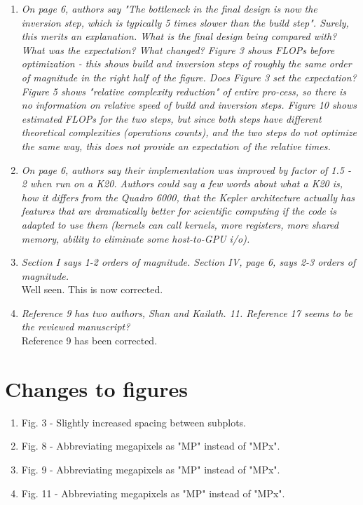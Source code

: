 \documentclass[11pt]{article} %
\newcommand\1{\vec 1}
\newcommand\q[1]{\textit{#1}}
\newcommand\qi[1]{\item\q{#1}}
\newcommand\ans[1]{#1}
\newcommand\ai[1]{\\[.5\baselineskip]\ans{#1}}
\begin{document}
\begin{enumerate}
%
\qi{On page 6, authors say "The bottleneck in the final design is now the inversion step, which is typically 5 times slower than the build step". Surely, this merits an explanation. What is the final design being compared with? What was the expectation? What changed? Figure 3 shows FLOPs before optimization - this shows build and inversion steps of roughly the same order of magnitude in the right half of the figure. Does Figure 3 set the expectation? Figure 5 shows "relative complexity reduction" of entire pro-cess, so there is no information on relative speed of build and inversion steps. Figure 10 shows estimated FLOPs for the two steps, but since both steps have different theoretical complexities (operations counts), and the two steps do not optimize the same way, this does not provide an expectation of the relative times.}
\qi{On page 6, authors say their implementation was improved by factor of 1.5 - 2 when run on a K20. Authors could say a few words about what a K20 is, how it differs from the Quadro 6000, that the Kepler architecture actually has features that are dramatically better for scientific computing if the code is adapted to use them (kernels can call kernels, more registers, more shared memory, ability to eliminate some host-to-GPU i/o).}
\qi{Section I says 1-2 orders of magnitude. Section IV, page 6, says 2-3 orders of magnitude.}
\ai{Well seen. This is now corrected.}
\qi{Reference 9 has two authors, Shan and Kailath. 11. Reference 17 seems to be the reviewed manuscript? }
\ai{Reference 9 has been corrected. }
\end{enumerate}

\newpage
\section{Changes to figures}

\begin{enumerate}
\item Fig. 3 - Slightly increased spacing between subplots.
\item Fig. 8 - Abbreviating megapixels as "MP" instead of "MPx".
\item Fig. 9 - Abbreviating megapixels as "MP" instead of "MPx".
\item Fig. 11 - Abbreviating megapixels as "MP" instead of "MPx".
\end{enumerate}
\end{document}
